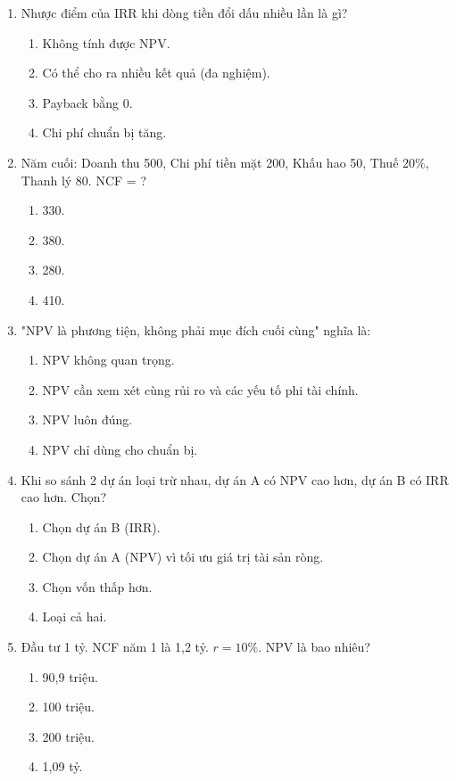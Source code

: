 \begin{enumerate}[label=\textbf{Câu \arabic*:}, leftmargin=*, resume]
\item Nhược điểm của IRR khi dòng tiền đổi dấu nhiều lần là gì?
\begin{enumerate}[label=\Alph*.]
    \item Không tính được NPV.
    \item Có thể cho ra nhiều kết quả (đa nghiệm).
    \item Payback bằng 0.
    \item Chi phí chuẩn bị tăng.
\end{enumerate}

\item Năm cuối: Doanh thu 500, Chi phí tiền mặt 200, Khấu hao 50, Thuế 20\%, Thanh lý 80. NCF = ?
\begin{enumerate}[label=\Alph*.]
    \item 330. \item 380. \item 280. \item 410.
\end{enumerate}

\item "NPV là phương tiện, không phải mục đích cuối cùng" nghĩa là:
\begin{enumerate}[label=\Alph*.]
    \item NPV không quan trọng.
    \item NPV cần xem xét cùng rủi ro và các yếu tố phi tài chính.
    \item NPV luôn đúng.
    \item NPV chỉ dùng cho chuẩn bị.
\end{enumerate}

\item Khi so sánh 2 dự án loại trừ nhau, dự án A có NPV cao hơn, dự án B có IRR cao hơn. Chọn?
\begin{enumerate}[label=\Alph*.]
    \item Chọn dự án B (IRR).
    \item Chọn dự án A (NPV) vì tối ưu giá trị tài sản ròng.
    \item Chọn vốn thấp hơn.
    \item Loại cả hai.
\end{enumerate}

\item Đầu tư 1 tỷ. NCF năm 1 là 1,2 tỷ. $r=10\%$. NPV là bao nhiêu?
\begin{enumerate}[label=\Alph*.]
    \item 90,9 triệu. \item 100 triệu. \item 200 triệu. \item 1,09 tỷ.
\end{enumerate}

\end{enumerate}

